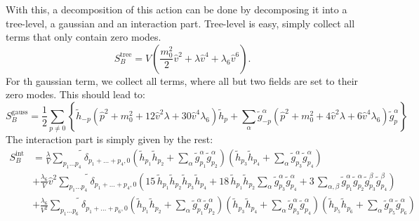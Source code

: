 With this, a decomposition of this action can be done by decomposing it into a tree-level, a gaussian and an interaction part. Tree-level is easy, simply collect
all terms that only contain zero modes. 
\begin{equation}\label{eq:tree_level_action_inBrokenPhase}
 S_B^{\text{tree}} = V \left( \frac{m_0^2}{2} \hat v^2 + \lambda \hat v^4 + \lambda_6 \hat v ^6 \right).
\end{equation}
For th gaussian term, we collect all terms, where all but two fields are set to their zero modes. This should lead to:
\begin{equation}\label{eq:improvedGaussian_action_inBrokenPhase}
 S_B^{\text{gauss}} = \frac{1}{2}\sum\limits_{p \neq 0} \left\{
                 \tilde h_{-p} \left ( \hat p^2 + m_0^2 + 12 \hat v^2 \lambda + 30 \hat v^4 \lambda_6 \right) \tilde h_p
                 + \sum\limits_{\alpha} 
                 \tilde g^{\alpha}_{-p} \left ( \hat p^2 + m_0^2 + 4 \hat v^2 \lambda + 6 \hat v^4 \lambda_6 \right) \tilde g^{\alpha}_p
                 \right\}
\end{equation}
The interaction part is simply given by the rest:
\begin{align}\label{eq:improvedInteraction_action_inBrokenPhase}
 S_B^{\text{int}} & = \frac{\lambda}{V}\widetilde{\sum\limits_{p_1\dots p_4}} \delta_{p_1+ \dots +p_4,0} 
                      \left( \tilde h_{p_1} \tilde h_{p_2} + \sum\limits_{\alpha} \tilde g^{\alpha}_{p_1} \tilde g^{\alpha}_{p_2} \right)
                      \left( \tilde h_{p_3} \tilde h_{p_4} + \sum\limits_{\alpha} \tilde g^{\alpha}_{p_3} \tilde g^{\alpha}_{p_4} \right)
                      \nonumber \\
                  & + \frac{\lambda_6}{V}\hat v^2 \widetilde{\sum\limits_{p_1\dots p_4}} \delta_{p_1+ \dots +p_4,0} \left(
                    15 \, \tilde h_{p_1} \tilde h_{p_2} \tilde h_{p_3} \tilde h_{p_4} 
                    + 18 \, \tilde h_{p_1} \tilde h_{p_2} \sum\limits_{\alpha} \tilde g^{\alpha}_{p_3} \tilde g^{\alpha}_{p_4}
                    + 3  \, \sum\limits_{\alpha,\beta} \tilde g^{\alpha}_{p_1} \tilde g^{\alpha}_{p_2}\tilde g^{\beta}_{p_3} \tilde g^{\beta}_{p_4}
                 \right)
                      \nonumber \\
                  & + \frac{\lambda_6}{V^2} \widetilde {\sum \limits_{p_1 \dots p_6}} \delta_{p_1+ \dots +p_6,0} 
                \left( \tilde h_{p_1} \tilde h_{p_2} + \sum\limits_{\alpha} \tilde g^{\alpha}_{p_1} \tilde g^{\alpha}_{p_2} \right)
                \left( \tilde h_{p_3} \tilde h_{p_4} + \sum\limits_{\alpha} \tilde g^{\alpha}_{p_3} \tilde g^{\alpha}_{p_4} \right)
                \left( \tilde h_{p_5} \tilde h_{p_6} + \sum\limits_{\alpha} \tilde g^{\alpha}_{p_5} \tilde g^{\alpha}_{p_6} \right)
\end{align}
